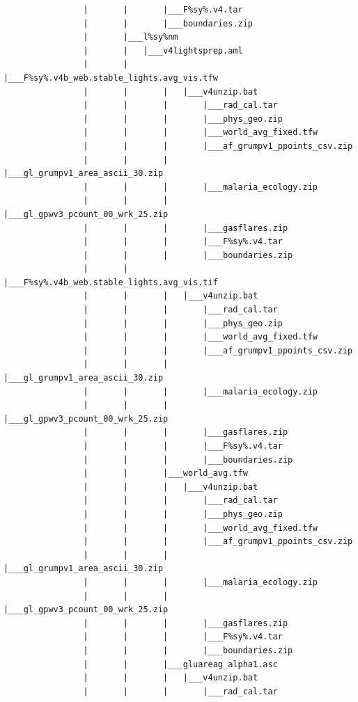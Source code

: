 \documentclass[]{book}
\begin{document}
\begin{verbatim}
                |       |       |___F%sy%.v4.tar
                |       |       |___boundaries.zip
                |       |___l%sy%nm
                |       |   |___v4lightsprep.aml
                |       |       |___F%sy%.v4b_web.stable_lights.avg_vis.tfw
                |       |       |   |___v4unzip.bat
                |       |       |       |___rad_cal.tar
                |       |       |       |___phys_geo.zip
                |       |       |       |___world_avg_fixed.tfw
                |       |       |       |___af_grumpv1_ppoints_csv.zip
                |       |       |       |___gl_grumpv1_area_ascii_30.zip
                |       |       |       |___malaria_ecology.zip
                |       |       |       |___gl_gpwv3_pcount_00_wrk_25.zip
                |       |       |       |___gasflares.zip
                |       |       |       |___F%sy%.v4.tar
                |       |       |       |___boundaries.zip
                |       |       |___F%sy%.v4b_web.stable_lights.avg_vis.tif
                |       |       |   |___v4unzip.bat
                |       |       |       |___rad_cal.tar
                |       |       |       |___phys_geo.zip
                |       |       |       |___world_avg_fixed.tfw
                |       |       |       |___af_grumpv1_ppoints_csv.zip
                |       |       |       |___gl_grumpv1_area_ascii_30.zip
                |       |       |       |___malaria_ecology.zip
                |       |       |       |___gl_gpwv3_pcount_00_wrk_25.zip
                |       |       |       |___gasflares.zip
                |       |       |       |___F%sy%.v4.tar
                |       |       |       |___boundaries.zip
                |       |       |___world_avg.tfw
                |       |       |   |___v4unzip.bat
                |       |       |       |___rad_cal.tar
                |       |       |       |___phys_geo.zip
                |       |       |       |___world_avg_fixed.tfw
                |       |       |       |___af_grumpv1_ppoints_csv.zip
                |       |       |       |___gl_grumpv1_area_ascii_30.zip
                |       |       |       |___malaria_ecology.zip
                |       |       |       |___gl_gpwv3_pcount_00_wrk_25.zip
                |       |       |       |___gasflares.zip
                |       |       |       |___F%sy%.v4.tar
                |       |       |       |___boundaries.zip
                |       |       |___gluareag_alpha1.asc
                |       |       |   |___v4unzip.bat
                |       |       |       |___rad_cal.tar

\end{verbatim}
\end{document}
